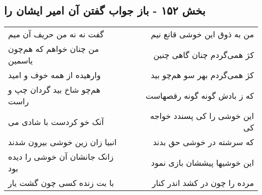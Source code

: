 \begin{center}
\section*{بخش ۱۵۲ - باز جواب گفتن آن امیر ایشان را}
\label{sec:sh152}
\begin{longtable}{l p{0.5cm} r}
گفت نه نه من حریف آن میم
&&
من به ذوق این خوشی قانع نیم
\\
من چنان خواهم که هم‌چون یاسمین
&&
کژ همی‌گردم چنان گاهی چنین
\\
وارهیده از همه خوف و امید
&&
کژ همی‌گردم بهر سو هم‌چو بید
\\
هم‌چو شاخ بید گردان چپ و راست
&&
که ز بادش گونه گونه رقصهاست
\\
آنک خو کردست با شادی می
&&
این خوشی را کی پسندد خواجه کی
\\
انبیا زان زین خوشی بیرون شدند
&&
که سرشته در خوشی حق بدند
\\
زانک جانشان آن خوشی را دیده بود
&&
این خوشیها پیششان بازی نمود
\\
با بت زنده کسی چون گشت یار
&&
مرده را چون در کشد اندر کنار
\\
\end{longtable}
\end{center}
